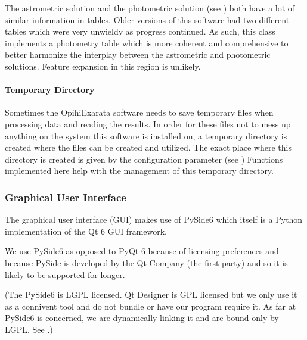 \documentclass[letterpaper,11pt,english]{sphinxmanual}
\begin{document}
\sphinxAtStartPar
The astrometric solution and the photometric solution
(see {\hyperref[\detokenize{technical/architecture/vehicles_solutions:technical-architecture-vehicles-solutions}]{}}) both have a lot of
similar information in tables. Older versions of this software had two
different tables which were very unwieldy as progress continued. As such,
this class implements a photometry table which is more coherent and
comprehensive to better harmonize the interplay between the astrometric and
photometric solutions. Feature expansion in this region is unlikely.


\paragraph{Temporary Directory}
\label{\detokenize{technical/architecture/library:temporary-directory}}
\sphinxAtStartPar
Sometimes the OpihiExarata software needs to save temporary files when
processing data and reading the results. In order for these files not to
mess up anything on the system this software is installed on, a temporary
directory is created where the files can be created and utilized. The exact
place where this directory is created is given by the configuration parameter
 (see {\hyperref[\detokenize{user/configuration:user-configuration}]{}}) Functions implemented
here help with the management of this temporary directory.

\sphinxstepscope


\subsubsection{Graphical User Interface}
\label{\detokenize{technical/architecture/graphical_user_interface:graphical-user-interface}}\label{\detokenize{technical/architecture/graphical_user_interface:technical-architecture-graphical-user-interface}}\label{\detokenize{technical/architecture/graphical_user_interface::doc}}
\sphinxAtStartPar
The graphical user interface (GUI) makes use of PySide6 which itself is a
Python implementation of the Qt 6 GUI framework.

\sphinxAtStartPar
We use PySide6 as opposed to PyQt 6 because of licensing preferences and
because PySide is developed by the Qt Company (the first party) and so it is
likely to be supported for longer.

\sphinxAtStartPar
(The PySide6 is LGPL licensed. Qt Designer is GPL licensed but we only use it
as a connivent tool and do not bundle or have our program require it. As far
at PySide6 is concerned, we are dynamically linking it and are bound only by
LGPL. See {\hyperref[\detokenize{technical/license:technical-architecture-license}]{}}.)
\end{document}
